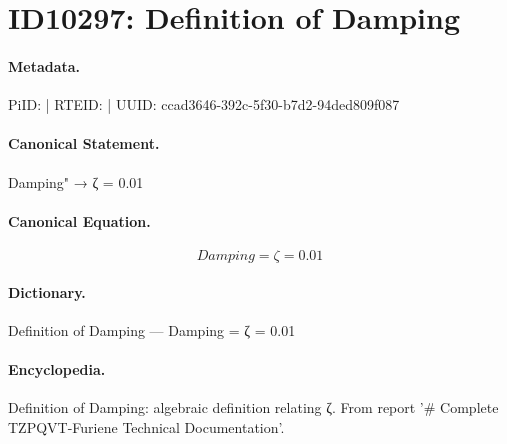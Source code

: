 \section*{ID10297: Definition of Damping}
\paragraph{Metadata.}
PiID:  | RTEID:  | UUID: ccad3646-392c-5f30-b7d2-94ded809f087

\paragraph{Canonical Statement.}
Damping" → ζ = 0.01

\paragraph{Canonical Equation.}
\[
Damping = ζ = 0.01
\]

\paragraph{Dictionary.}
Definition of Damping — Damping = ζ = 0.01

\paragraph{Encyclopedia.}
Definition of Damping: algebraic definition relating ζ. From report '\# Complete TZPQVT-Furiene Technical Documentation'.
